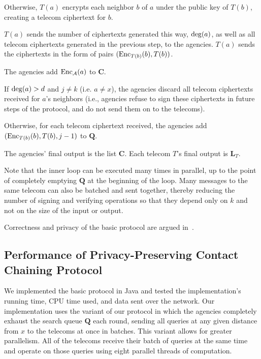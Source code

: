 \begin{compactenum}
\begin{compactenum}
\item Otherwise, $T(a)$ encrypts each neighbor $b$ of $a$ under the public key of $T(b)$, creating a telecom ciphertext for $b$.

\item \label{proto1:second-send} $T(a)$ sends the number of ciphertexts generated this way, $\operatorname{deg}(a)$, as well as all telecom ciphertexts generated in the previous step, to the agencies. $T(a)$ sends the ciphertexts in the form of pairs $(\operatorname{Enc}_{T(b)}(b), T(b))$.

\item \label{proto1:receive} The agencies add $\operatorname{Enc}_\mathcal{A}(a)$ to $\mathbf{C}$.

\item If $\operatorname{deg}(a)>d$ and $j\neq k$ (i.e. $a\neq x$), the agencies discard all telecom ciphertexts received for $a$'s neighbors (i.e., agencies refuse to sign these ciphertexts in future steps of the protocol, and do not send them on to the telecoms).

\item Otherwise, for each telecom ciphertext received, the agencies add $(\operatorname{Enc}_{T(b)}(b), T(b), j-1)$ to $\mathbf{Q}$.

\end{compactenum}

\item The agencies' final output is the list $\mathbf{C}$. Each telecom $T$'s final output is $\mathbf{L}_T$.

\end{compactenum}

Note that the inner loop can be executed many times in parallel, up to the point of completely emptying $\mathbf{Q}$ at the beginning of the loop. Many messages to the same telecom can also be batched and sent together, thereby reducing the number of signing and verifying operations so that they depend only on $k$ and not on the size of the input or output.

Correctness and privacy of the basic protocol are argued 
in~\cite[Section 4.2]{sff-TR}.

\subsection{Performance of Privacy-Preserving Contact Chaining Protocol}

We implemented the basic protocol in Java and tested the implementation's 
running time, CPU time used, and data sent over the network. 
Our implementation uses the variant of our protocol in which the agencies 
completely exhaust the search queue $\mathbf{Q}$ each round, 
sending all queries at any given distance from $x$ to the 
telecoms at once in batches. This variant allows for greater parallelism. 
All of the telecoms receive their batch of queries at the same time and 
operate on those queries using eight parallel threads of computation.

